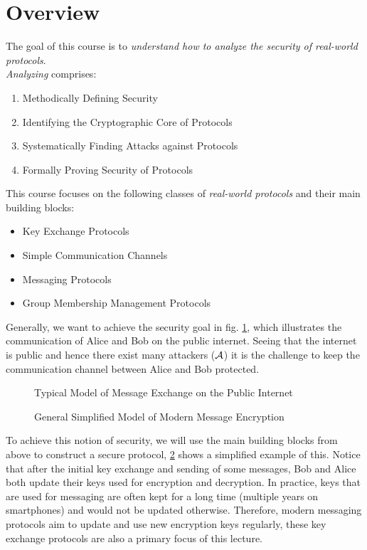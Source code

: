 \section{Overview}
\label{sec:overview}

The goal of this course is to \emph{understand how to analyze the security of real-world protocols}.\\
\emph{Analyzing} comprises:
\begin{enumerate}
    \item Methodically Defining Security
    \item Identifying the Cryptographic Core of Protocols
    \item Systematically Finding Attacks against Protocols
    \item Formally Proving Security of Protocols
\end{enumerate}
This course focuses on the following classes of \emph{real-world protocols} and their main building blocks:
\begin{itemize}
    \item Key Exchange Protocols
    \item Simple Communication Channels
    \item Messaging Protocols
    \item Group Membership Management Protocols
\end{itemize}
Generally, we want to achieve the security goal in fig. \ref{fig:intro-msg-exch}, which illustrates the communication of Alice and Bob on the public internet.
Seeing that the internet is public and hence there exist many attackers ($\mathcal{A}$) it is the challenge to keep the communication channel between Alice and Bob protected.
\begin{figure}
    \centering
    
    \caption{Typical Model of Message Exchange on the Public Internet}
    \label{fig:intro-msg-exch}
\end{figure}
\begin{figure}
    \centering
    
    \caption{General Simplified Model of Modern Message Encryption}
    \label{fig:simplified:secure:protocol}
\end{figure}
To achieve this notion of security, we will use the main building blocks from above to construct a secure protocol, \cref{fig:simplified:secure:protocol} shows a simplified example of this.
Notice that after the initial key exchange and sending of some messages, Bob and Alice both update their keys used for encryption and decryption.
In practice, keys that are used for messaging are often kept for a long time (multiple years on smartphones) and would not be updated otherwise.
Therefore, modern messaging protocols aim to update and use new encryption keys regularly, these key exchange protocols are also a primary focus of this lecture.

